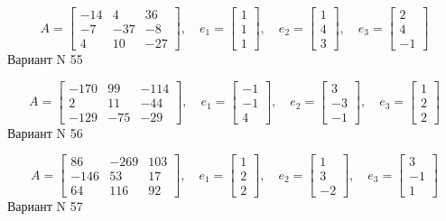 \documentclass[11pt]{report}
\begin{document}
$$A = \left[\begin{matrix}-14 & 4 & 36\\-7 & -37 & -8\\4 & 10 & -27\end{matrix}\right],\quad e_1 = \left[\begin{matrix}1\\1\\1\end{matrix}\right],\quad e_2 = \left[\begin{matrix}1\\4\\3\end{matrix}\right],\quad e_3 = \left[\begin{matrix}2\\4\\-1\end{matrix}\right]$$Вариант N 55

$$A = \left[\begin{matrix}-170 & 99 & -114\\2 & 11 & -44\\-129 & -75 & -29\end{matrix}\right],\quad e_1 = \left[\begin{matrix}-1\\-1\\4\end{matrix}\right],\quad e_2 = \left[\begin{matrix}3\\-3\\-1\end{matrix}\right],\quad e_3 = \left[\begin{matrix}1\\2\\2\end{matrix}\right]$$Вариант N 56

$$A = \left[\begin{matrix}86 & -269 & 103\\-146 & 53 & 17\\64 & 116 & 92\end{matrix}\right],\quad e_1 = \left[\begin{matrix}1\\2\\2\end{matrix}\right],\quad e_2 = \left[\begin{matrix}1\\3\\-2\end{matrix}\right],\quad e_3 = \left[\begin{matrix}3\\-1\\1\end{matrix}\right]$$Вариант N 57
\end{document}
